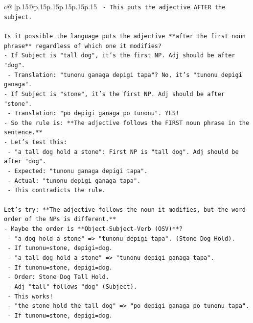 \documentclass{article}
\begin{document}
{\begin{supertabular}{c@{$\;$}|p{.15\linewidth}@{}p{.15\linewidth}p{.15\linewidth}p{.15\linewidth}p{.15\linewidth}p{.15\linewidth}}
{{{\texttt{  {-} This puts the adjective AFTER the subject.} \\
\\ 
\texttt{Is it possible the language puts the adjective **after the first noun phrase** regardless of which one it modifies?} \\
\texttt{{-} If Subject is "tall dog", it's the first NP. Adj should be after "dog".} \\
\texttt{  {-} Translation: "tunonu ganaga depigi tapa"? No, it's "tunonu depigi ganaga".} \\
\texttt{{-} If Subject is "stone", it's the first NP. Adj should be after "stone".} \\
\texttt{  {-} Translation: "po depigi ganaga po tunonu". YES!} \\
\texttt{{-} So the rule is: **The adjective follows the FIRST noun phrase in the sentence.**} \\
\texttt{{-} Let's test this:} \\
\texttt{  {-} "a tall dog hold a stone": First NP is "tall dog". Adj should be after "dog".} \\
\texttt{    {-} Expected: "tunonu ganaga depigi tapa".} \\
\texttt{    {-} Actual: "tunonu depigi ganaga tapa".} \\
\texttt{    {-} This contradicts the rule.} \\
\\ 
\texttt{Let's try: **The adjective follows the noun it modifies, but the word order of the NPs is different.**} \\
\texttt{{-} Maybe the order is **Object{-}Subject{-}Verb (OSV)**?} \\
\texttt{  {-} "a dog hold a stone" => "tunonu depigi tapa". (Stone Dog Hold).} \\
\texttt{    {-} If tunonu=stone, depigi=dog.} \\
\texttt{  {-} "a tall dog hold a stone" => "tunonu depigi ganaga tapa".} \\
\texttt{    {-} If tunonu=stone, depigi=dog.} \\
\texttt{    {-} Order: Stone Dog Tall Hold.} \\
\texttt{    {-} Adj "tall" follows "dog" (Subject).} \\
\texttt{    {-} This works!} \\
\texttt{  {-} "the stone hold the tall dog" => "po depigi ganaga po tunonu tapa".} \\
\texttt{    {-} If tunonu=stone, depigi=dog.} \\
}}}
\end{supertabular}}
\end{document}

